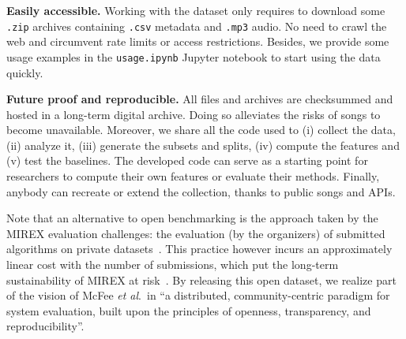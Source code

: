 \documentclass{article}
\newcommand{\todo}[1]{{\color{red} #1}}
\begin{document}
\textbf{Easily accessible.} Working with the dataset only requires to download some \texttt{.zip} archives containing \texttt{.csv} metadata and \texttt{.mp3} audio. No need to crawl the web and circumvent rate limits or access restrictions. Besides, we provide
some usage examples in the \texttt{usage.ipynb} Jupyter notebook to start using the data quickly.

\textbf{Future proof and reproducible.} All files and archives are checksummed and hosted in a long-term digital archive.
Doing so alleviates the risks of songs to become unavailable.
Moreover, we share all the code used to (i) collect the data, (ii) analyze it, (iii) generate the subsets and splits, (iv) compute the features and (v) test the baselines. The developed code can serve as a starting point for researchers to compute their own features or evaluate their methods.
Finally, anybody can recreate or extend the collection, thanks to public songs and APIs.

Note that an alternative to open benchmarking is the approach taken by the MIREX evaluation challenges: the evaluation (by the organizers) of submitted algorithms on private datasets~\cite{mirex}. This practice however incurs an approximately linear cost with the number of submissions, which put the long-term sustainability of MIREX at risk~\cite{mirex_critic}. By releasing this open dataset, we realize part of the vision of McFee \textit{et al}.\ in ``a distributed, community-centric paradigm for system evaluation, built upon the principles of openness, transparency, and reproducibility''.
\end{document}
